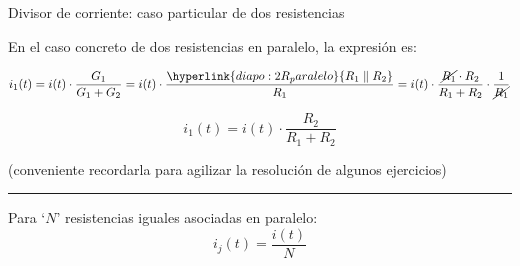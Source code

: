 \documentclass[aspectratio=169, xcolor={usenames,svgnames,dvipsnames}]{beamer}
\begin{document}

\begin{frame}{Divisor de corriente: \hspace{3mm} caso particular de dos resistencias}

    \vspace{5mm}
    En el caso concreto de \alert{dos resistencias en paralelo}, la expresión es:
    
    \begin{equation*}
      i_1(t) = i(t) \cdot \frac{G_1}{G_1 + G_2} = i(t) \cdot \frac{\hyperlink{diapo:2R_paralelo}{R_1 \parallel R_2}}{R_1} = i(t) \cdot \frac{\cancel{R_1} \cdot R_2}{R_1 + R_2} \cdot \frac{1}{\cancel{R_1}}
    \end{equation*} %
    
    \begin{equation*}
      \boxed{i_1(t) = i(t) \cdot \frac{R_2}{R_1 + R_2}}
    \end{equation*}
    
    \centering \small{(conveniente recordarla para agilizar la resolución de algunos ejercicios)} 

    \vspace{2mm}
    
    \noindent\rule{\textwidth}{0.5pt}

    \vspace{2mm}

    Para `$N$' \alert{resistencias iguales} asociadas en paralelo: 
    \[
        i_j(t) = \frac{i(t)}{N}
    \]
\end{frame}

\end{document}
